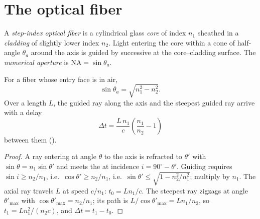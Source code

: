 \section{The optical fiber}

\begin{definition}\label{def:b1:rays-reflection-refraction:fiber}
A \emph{step-index optical fiber} is a cylindrical glass \emph{core} of
index $n_1$ sheathed in a \emph{cladding} of slightly lower index $n_2$.
Light entering the core within a cone of half-angle $\theta_a$ around
the axis is guided by successive  at the
core--cladding surface. The \emph{numerical aperture} is
$\mathrm{NA} = \sin\theta_a$.
\end{definition}

\begin{proposition}\label{prop:b1:rays-reflection-refraction:fiber}
For a fiber whose entry face is in air,
\[
\sin\theta_a = \sqrt{n_1^2 - n_2^2} .
\]
Over a length $L$, the guided ray along the axis and the steepest
guided ray arrive with a delay
\[
\Delta t = \frac{L\,n_1}{c}\left(\frac{n_1}{n_2} - 1\right)
\]
between them (\emph{}).
\end{proposition}

\begin{proof}
A ray entering at angle $\theta$ to the axis is refracted to $\theta'$
with $\sin\theta = n_1\sin\theta'$ and meets the  at incidence
$i = 90^\circ - \theta'$. Guiding requires $\sin i \geq n_2/n_1$, i.e.\
$\cos\theta' \geq n_2/n_1$, i.e.\ $\sin\theta' \leq
\sqrt{1 - n_2^2/n_1^2}$; multiply by $n_1$. The axial ray travels $L$ at
speed $c/n_1$: $t_0 = Ln_1/c$. The steepest ray zigzags at angle
$\theta'_{\max}$ with $\cos\theta'_{\max} = n_2/n_1$; its path is
$L/\cos\theta'_{\max} = L n_1/n_2$, so $t_1 = L n_1^2/(n_2 c)$, and
$\Delta t = t_1 - t_0$.
\end{proof}

